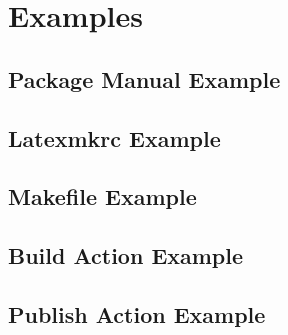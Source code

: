 \documentclass{xdpdoc}
\begin{document}
    \clearpage


    \section{Examples}

    \subsection{Package Manual Example}

    

    \subsection{Latexmkrc Example}

    

    \subsection{Makefile Example}
    

    \clearpage

    \subsection{Build Action Example}
    

    \subsection{Publish Action Example}
    

    \printbibliography
\end{document}
